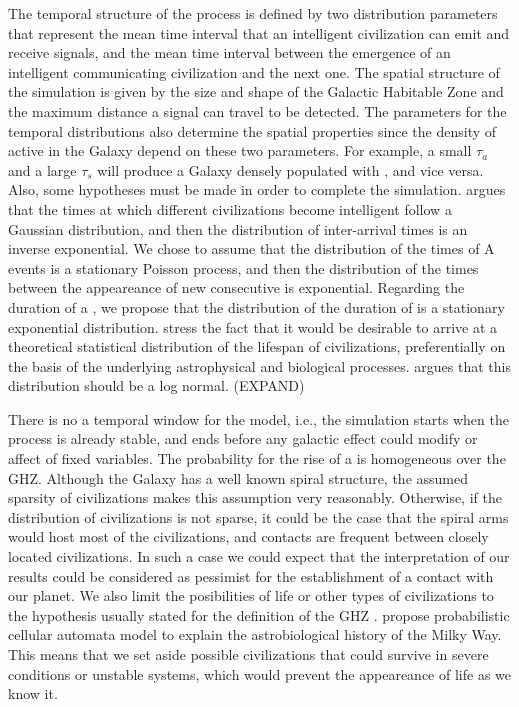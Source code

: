The temporal structure of the process is defined by two distribution
parameters that represent the mean time interval that an intelligent
civilization can emit and receive signals, and the mean time interval
between the emergence of an intelligent communicating civilization and
the next one.
%
The spatial structure of the simulation is given by the size and shape
of the Galactic Habitable Zone and the maximum distance a signal can
travel to be detected.
%
The parameters for the temporal distributions also determine the
spatial properties since the density of active \cetis in the Galaxy
depend on these two parameters.
%
For example, a small $\tau_a$ and a large $\tau_s$ will produce a
Galaxy densely populated with \cetis, and vice versa.
%
Also, some hypotheses must be made in order to complete the
simulation.
%
\citet{forgan_spatiotemporal_2011} argues that the times at which
different civilizations become intelligent follow a Gaussian
distribution, and then the distribution of inter-arrival times is an
inverse exponential.
%
We chose to assume that the distribution of the times of A events is a
stationary Poisson process, and then the distribution of the times
between the appeareance of new consecutive \cetis is exponential.
%
Regarding the duration of a \ceti, we propose that the distribution of
the duration of \cetis is a stationary exponential distribution.
%
\citet{balbi_impact_2018} stress the fact that it would be desirable
to arrive at a theoretical statistical distribution of the lifespan of
civilizations, preferentially on the basis of the underlying
astrophysical and biological processes.
%
\citet{maccone_lognormals_2014} argues that this distribution should
be a log normal.  (EXPAND)



There is no a temporal window for the model, i.e., the simulation
starts when the process is already stable, and ends before any
galactic effect could modify or affect of fixed variables.
%
The probability for the rise of a \ceti is homogeneous over the GHZ.
%
Although the Galaxy has a well known spiral structure, the assumed
sparsity of civilizations makes this assumption very reasonably.
%
Otherwise, if the distribution of civilizations is not sparse, it
could be the case that the spiral arms would host most of the
civilizations, and contacts are frequent between closely located
civilizations.
%
In such a case we could expect that the interpretation of our results
could be considered as pessimist for the establishment of a contact with
our planet.
%
We also limit the posibilities of life or other types of civilizations
to the hypothesis usually stated for the definition of the GHZ
\citep{dayal_habitability_2016, gonzalez_galactic_2001,
lineweaver_galactic_2004, gonzalez_habitable_2005,
morrison_extending_2015, haqq-misra_evolution_2019,
rahvar_cosmic_2016, gobat_evolution_2016, rahvar_cosmic_2016}.
%
\citet{vukotic_astrobiological_2012} propose probabilistic cellular
automata model to explain the astrobiological history of the Milky
Way.
%
This means that we set aside possible civilizations that could survive
in severe conditions or unstable systems, which would prevent the
appeareance of life as we know it.


